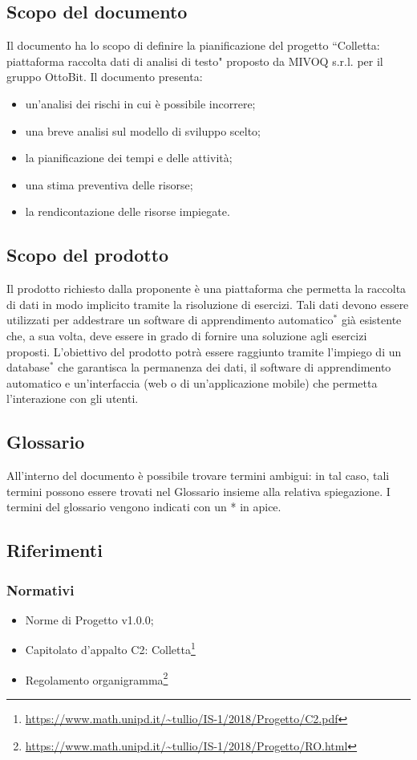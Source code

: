 \subsection{Scopo del documento}
	Il documento ha lo scopo di definire la pianificazione del progetto ``Colletta: piattaforma raccolta dati di analisi di testo" proposto da MIVOQ s.r.l. per il gruppo OttoBit. Il documento presenta:
	\begin{itemize}
		\item un'analisi dei rischi in cui è possibile incorrere;
		\item una breve analisi sul modello di sviluppo scelto;
		\item la pianificazione dei tempi e delle attività;
		\item una stima preventiva delle risorse;
		\item la rendicontazione delle risorse impiegate.
	\end{itemize}

\subsection{Scopo del prodotto}
	Il prodotto richiesto dalla proponente è una piattaforma che permetta la raccolta di dati in modo implicito tramite la risoluzione di esercizi. Tali dati devono essere utilizzati per addestrare un software di apprendimento automatico$^*$ già esistente che, a sua volta, deve essere in grado di fornire una soluzione agli esercizi proposti. L'obiettivo del prodotto potrà essere raggiunto tramite l'impiego di un database$^*$ che garantisca la permanenza dei dati, il software di apprendimento automatico e un'interfaccia (web o di un'applicazione mobile) che permetta l'interazione con gli utenti.

\subsection{Glossario}
	All'interno del documento è possibile trovare termini ambigui: in tal caso, tali termini possono essere trovati nel Glossario insieme alla relativa spiegazione. I termini del glossario vengono indicati con un * in apice.
	
\subsection{Riferimenti}
	\subsubsection{Normativi}
		\begin{itemize}
			\item Norme di Progetto v1.0.0;
			\item Capitolato d'appalto C2: Colletta\footnote{\url{https://www.math.unipd.it/~tullio/IS-1/2018/Progetto/C2.pdf}}
			\item Regolamento organigramma\footnote{\url{https://www.math.unipd.it/~tullio/IS-1/2018/Progetto/RO.html}}
		\end{itemize}
